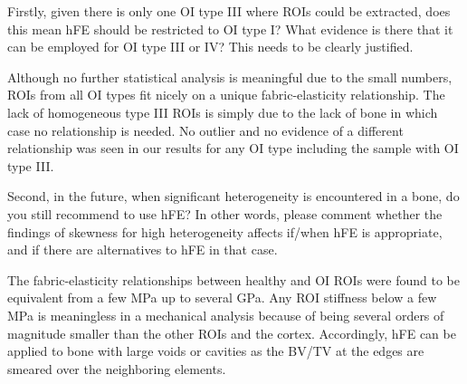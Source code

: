 \documentclass{AR2RC}
\begin{document}
\newpage
\RC Firstly, given there is only one OI type III where ROIs could be extracted, does this mean hFE should be restricted to OI type I? What evidence is there that it can be employed for OI type III or IV? This needs to be clearly justified. 

\AR Although no further statistical analysis is meaningful due to the small numbers, ROIs from all OI types fit nicely on a unique fabric-elasticity relationship. The lack of homogeneous type III ROIs is simply due to the lack of bone in which case no relationship is needed. No outlier and no evidence of a different relationship was seen in our results for any OI type including the sample with OI type III.

\RC Second, in the future, when significant heterogeneity is encountered in a bone, do you still recommend to use hFE? In other words, please comment whether the findings of skewness for high heterogeneity affects if/when hFE is appropriate, and if there are alternatives to hFE in that case.

\AR The fabric-elasticity relationships between healthy and OI ROIs were found to be equivalent from a few MPa up to several GPa. Any ROI stiffness below a few MPa is meaningless in a mechanical analysis because of being several orders of magnitude smaller than the other ROIs and the cortex. Accordingly, hFE can be applied to bone with large voids or cavities as the BV/TV at the edges are smeared over the neighboring elements.


\end{document}
